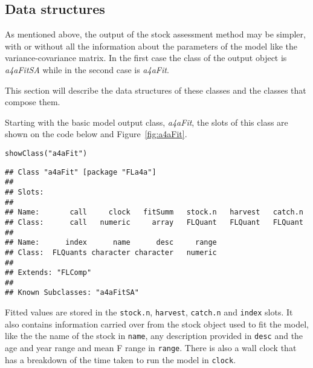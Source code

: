\documentclass[a4paper,english,10pt]{article}\usepackage[]{graphicx}\usepackage[]{color}
\makeatletter
\newcommand{\hlstr}[1]{\textcolor[rgb]{0.2,0.2,0.2}{#1}}%
\newcommand{\hlstd}[1]{\textcolor[rgb]{0,0,0}{#1}}%
\newcommand{\hlkwd}[1]{\textcolor[rgb]{0.361,0.506,0.596}{#1}}%
\newenvironment{kframe}{%
 \def\at@end@of@kframe{}%
 \ifinner\ifhmode%
  \def\at@end@of@kframe{\end{minipage}}%
  \begin{minipage}{\columnwidth}%
 \fi\fi%
 \def\FrameCommand##1{\hskip\@totalleftmargin \hskip-\fboxsep
 \colorbox{shadecolor}{##1}\hskip-\fboxsep
     \hskip-\linewidth \hskip-\@totalleftmargin \hskip\columnwidth}%
 \MakeFramed {\advance\hsize-\width
   \@totalleftmargin\z@ \linewidth\hsize
   \@setminipage}}%
 {\par\unskip\endMakeFramed%
 \at@end@of@kframe}
\newenvironment{knitrout}{}{} %
\newcommand{\code}[1]{{\texttt{#1}}}
\newcommand{\class}[1]{{\textit{#1}}}
\makeatother
\begin{document}
\subsection{Data structures}

As mentioned above, the output of the stock assessment method may be simpler, with or without all the information about the parameters of the model like the variance-covariance matrix. In the first case the class of the output object is \class{a4aFitSA} while in the second case is \class{a4aFit}.

This section will describe the data structures of these classes and the classes that compose them.

Starting with the basic model output class, \class{a4aFit}, the slots of this class are shown on the code below and Figure~\ref{fig:a4aFit}.

\begin{knitrout}
\color{fgcolor}\begin{kframe}
\begin{alltt}
\hlkwd{showClass}\hlstd{(}\hlstr{"a4aFit"}\hlstd{)}
\end{alltt}
\begin{verbatim}
## Class "a4aFit" [package "FLa4a"]
## 
## Slots:
##                                                                   
## Name:       call     clock   fitSumm   stock.n   harvest   catch.n
## Class:      call   numeric     array   FLQuant   FLQuant   FLQuant
##                                               
## Name:      index      name      desc     range
## Class:  FLQuants character character   numeric
## 
## Extends: "FLComp"
## 
## Known Subclasses: "a4aFitSA"
\end{verbatim}
\end{kframe}
\end{knitrout}

\begin{knitrout}
\color{fgcolor}\begin{kframe}


{\ttfamily\noindent\bfseries{}}\end{kframe}
\end{knitrout}

Fitted values are stored in the \code{stock.n}, \code{harvest}, \code{catch.n} and \code{index} slots. It also contains information carried over from the stock object used to fit the model, like the the name of the stock in \code{name}, any description provided in \code{desc} and the age and year range and mean F range in \code{range}. There is also a wall clock that has a breakdown of the time taken to run the model in \code{clock}.
\end{document}
